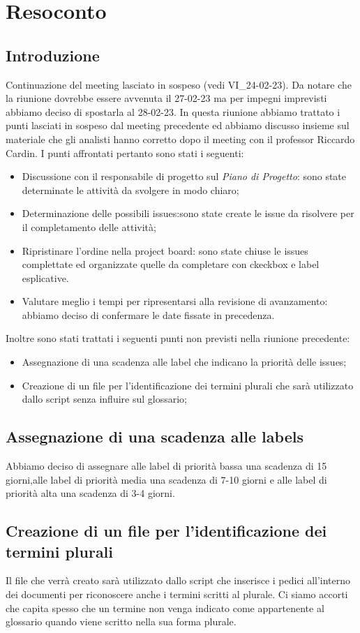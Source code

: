 \section{Resoconto}
\subsection{Introduzione}
Continuazione del meeting lasciato in sospeso (vedi VI\_24-02-23).
Da notare che la riunione dovrebbe essere avvenuta il 27-02-23 ma per impegni imprevisti abbiamo deciso di spostarla al 28-02-23.
In questa riunione abbiamo trattato i punti lasciati in sospeso dal meeting precedente ed abbiamo discusso insieme sul materiale che
gli analisti hanno corretto dopo il meeting con il professor Riccardo Cardin.
I punti affrontati pertanto sono stati i seguenti:
\begin{itemize}
    \item Discussione con il responsabile di progetto sul \textit{Piano di Progetto}: sono state determinate le attività da svolgere in modo chiaro;
    \item Determinazione delle possibili issues:sono state create le issue da risolvere per il completamento delle attività;
    \item Ripristinare l'ordine nella project board: sono state chiuse le issues complettate ed organizzate quelle da completare con ckeckbox e label esplicative.
    \item Valutare meglio i tempi per ripresentarsi alla revisione di avanzamento: abbiamo deciso di confermare le date fissate in precedenza.
    \end{itemize}
Inoltre sono stati trattati i seguenti punti non previsti nella riunione precedente:
\begin{itemize}
\item Assegnazione di una scadenza alle label che indicano la priorità delle issues;
\item Creazione di un file per l'identificazione dei termini plurali che sarà utilizzato dallo script senza influire sul glossario;
\end{itemize}
\subsection{Assegnazione di una scadenza alle labels}
Abbiamo deciso di assegnare alle label di priorità bassa una scadenza di 15 giorni,alle label di priorità media una scadenza di 7-10 giorni e alle 
label di priorità alta una scadenza di 3-4 giorni.
\subsection{Creazione di un file per l'identificazione dei termini plurali}
Il file che verrà creato sarà utilizzato dallo script che inserisce i pedici all'interno dei documenti per riconoscere anche i termini scritti al 
plurale. Ci siamo accorti che capita spesso che un termine non venga indicato come appartenente al glossario quando viene scritto nella 
sua forma plurale.